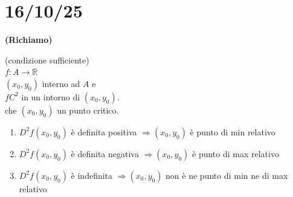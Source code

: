 \documentclass[a4paper, oneside]{article}
\begin{document}
        \section{16/10/25}
        \textbf{(Richiamo)}
        \begin{theorem}
            (condizione sufficiente)\\
             $f : A \to \mathbb{R}$\\
             $(x_0,y_0)$ interno ad $A$ e \\
             $f C^2$ in un intorno di $(x_0,y_0)$.\\
             che $(x_0,y_0)$ un punto critico.\\
            \begin{enumerate}[$i)$]
                \item {} $D^2f(x_0,y_0)$ è definita positiva $\Rightarrow (x_0,y_0)$ è punto di min relativo
                \item {} $D^2f(x_0,y_0)$ è definita negativa $\Rightarrow (x_0,y_0)$ è punto di max relativo
                \item {} $D^2f(x_0,y_0)$ è indefinita $\Rightarrow (x_0,y_0)$ non è ne punto di min ne di max relativo
            \end{enumerate}
        \end{theorem}
\end{document}
